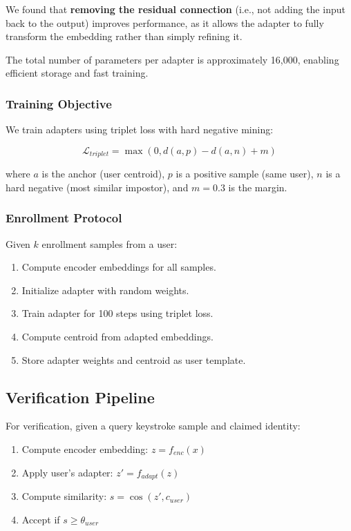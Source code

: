 \documentclass{ieeeaccess}
\begin{document}
{We found that \textbf{removing the residual connection} (i.e., not adding the input back to the output) improves performance, as it allows the adapter to fully transform the embedding rather than simply refining it.

The total number of parameters per adapter is approximately 16,000, enabling efficient storage and fast training.

\subsubsection{Training Objective}
We train adapters using triplet loss with hard negative mining:

\begin{equation}
\mathcal{L}_{triplet} = \max(0, d(a, p) - d(a, n) + m)
\label{eq:triplet}
\end{equation}

where $a$ is the anchor (user centroid), $p$ is a positive sample (same user), $n$ is a hard negative (most similar impostor), and $m = 0.3$ is the margin.

\subsubsection{Enrollment Protocol}
Given $k$ enrollment samples from a user:
\begin{enumerate}
\item Compute encoder embeddings for all samples.
\item Initialize adapter with random weights.
\item Train adapter for 100 steps using triplet loss.
\item Compute centroid from adapted embeddings.
\item Store adapter weights and centroid as user template.
\end{enumerate}

\subsection{Verification Pipeline}
For verification, given a query keystroke sample and claimed identity:

\begin{enumerate}
\item Compute encoder embedding: $z = f_{enc}(x)$
\item Apply user's adapter: $z' = f_{adapt}(z)$
\item Compute similarity: $s = \cos(z', c_{user})$
\item Accept if $s \geq \theta_{user}$
\end{enumerate}

}
\end{document}
